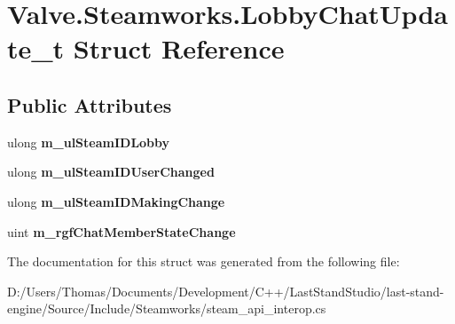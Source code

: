 \hypertarget{structValve_1_1Steamworks_1_1LobbyChatUpdate__t}{}\section{Valve.\+Steamworks.\+Lobby\+Chat\+Update\+\_\+t Struct Reference}
\label{structValve_1_1Steamworks_1_1LobbyChatUpdate__t}
\subsection*{Public Attributes}
\begin{DoxyCompactItemize}
\item 
\hypertarget{structValve_1_1Steamworks_1_1LobbyChatUpdate__t_ab5fe695c1dbd0459392e58ead3012100}{}ulong {\bfseries m\+\_\+ul\+Steam\+I\+D\+Lobby}\label{structValve_1_1Steamworks_1_1LobbyChatUpdate__t_ab5fe695c1dbd0459392e58ead3012100}

\item 
\hypertarget{structValve_1_1Steamworks_1_1LobbyChatUpdate__t_a162d5099b3bff6896112faf96eb7ed58}{}ulong {\bfseries m\+\_\+ul\+Steam\+I\+D\+User\+Changed}\label{structValve_1_1Steamworks_1_1LobbyChatUpdate__t_a162d5099b3bff6896112faf96eb7ed58}

\item 
\hypertarget{structValve_1_1Steamworks_1_1LobbyChatUpdate__t_a281811ac1acc31c66fd17385440a6720}{}ulong {\bfseries m\+\_\+ul\+Steam\+I\+D\+Making\+Change}\label{structValve_1_1Steamworks_1_1LobbyChatUpdate__t_a281811ac1acc31c66fd17385440a6720}

\item 
\hypertarget{structValve_1_1Steamworks_1_1LobbyChatUpdate__t_a039d7735d14130073dff62fdc61c43a8}{}uint {\bfseries m\+\_\+rgf\+Chat\+Member\+State\+Change}\label{structValve_1_1Steamworks_1_1LobbyChatUpdate__t_a039d7735d14130073dff62fdc61c43a8}

\end{DoxyCompactItemize}


The documentation for this struct was generated from the following file\+:\begin{DoxyCompactItemize}
\item 
D\+:/\+Users/\+Thomas/\+Documents/\+Development/\+C++/\+Last\+Stand\+Studio/last-\/stand-\/engine/\+Source/\+Include/\+Steamworks/steam\+\_\+api\+\_\+interop.\+cs\end{DoxyCompactItemize}
